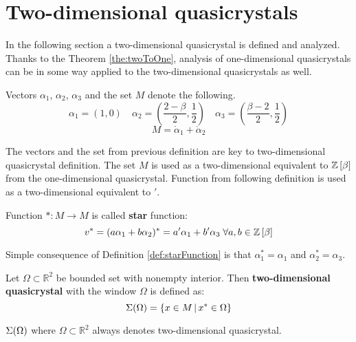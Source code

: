 \documentclass[text.tex]{subfiles}
\begin{document}
\section{Two-dimensional quasicrystals}%
\label{sec:twoDimension}
In the following section a two-dimensional quasicrystal is defined and analyzed. Thanks to the Theorem \ref{the:twoToOne}, analysis of one-dimensional quasicrystals can be in some way applied to the two-dimensional quasicrystals as well. 
\begin{definition}
Vectors $\alpha_1$, $\alpha_2$, $\alpha_3$ and the set $M$ denote the following.
$$\alpha_1 = \left( 1,0 \right) \quad \alpha_2 = \left( \frac{2-\beta}{2}, \frac{1}{2} \right) \quad \alpha_3 = \left( \frac{\beta-2}{2}, \frac{1}{2} \right)$$
$$M = \ring\alpha_1 + \ring\alpha_2$$
\end{definition}

\begin{remark}
The vectors and the set from previous definition are key to two-dimensional quasicrystal definition. The set $M$ is used as a two-dimensional equivalent to $\mathbb{Z}\left[\beta\right]$ from the one-dimensional quasicrystal. Function from following definition is used as a two-dimensional equivalent to $'$.
\end{remark}

\begin{definition}
\label{def:starFunction}
Function $\ast: M \to M$ is called \textbf{star} function:
$$v^\ast = (a\alpha_1 + b\alpha_2)^\ast = a'\alpha_1 + b'\alpha_3 \;\forall a,b\in\mathbb{Z}\left[\beta\right]$$
\end{definition}

\begin{remark}
Simple consequence of Definition \ref{def:starFunction} is that $\alpha_1^\ast = \alpha_1$ and $\alpha_2^\ast = \alpha_3$.
\end{remark}

\begin{definition}
Let $\Omega \subset \mathbb{R}^2$ be bounded set with nonempty interior. Then \textbf{two-dimensional quasicrystal} with the window $\Omega$ is defined as:
$$\Sigma(\Omega) = \left\{ x \in M\,|\,x^\ast \in \Omega \right\}$$
\end{definition}

\begin{remark}
$\Sigma(\Omega)$ where $\Omega \subset \mathbb{R}^2$ always denotes two-dimensional quasicrystal.
\end{remark}
\end{document}
